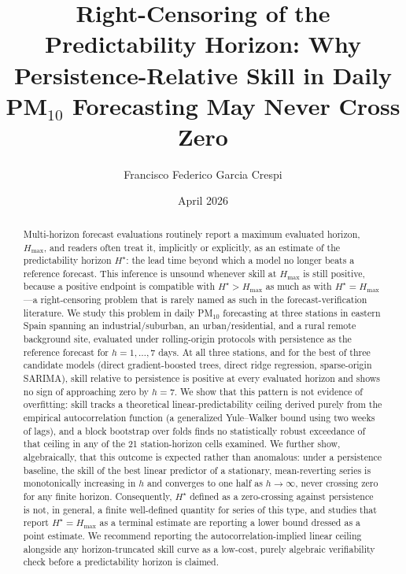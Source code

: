 \documentclass{article}
\title{Right-Censoring of the Predictability Horizon: Why
Persistence-Relative Skill in Daily PM$_{10}$ Forecasting May Never Cross Zero}
\author{Francisco Federico Garcia Crespi}
\date{April 2026}
\newcommand{\hstar}{H^{\star}}
\begin{document}
\maketitle

\begin{abstract}
Multi-horizon forecast evaluations routinely report a maximum evaluated
horizon, $H_{\max}$, and readers often treat it, implicitly or explicitly, as
an estimate of the predictability horizon $\hstar$: the lead time beyond which
a model no longer beats a reference forecast.
This inference is unsound whenever skill at $H_{\max}$ is still positive,
because a positive endpoint is compatible with $\hstar > H_{\max}$ as much as
with $\hstar = H_{\max}$---a right-censoring problem that is rarely named as
such in the forecast-verification literature.
We study this problem in daily PM$_{10}$ forecasting at three stations in
eastern Spain spanning an industrial/suburban, an urban/residential, and a
rural remote background site, evaluated under rolling-origin protocols with
persistence as the reference forecast for $h=1,\dots,7$ days.
At all three stations, and for the best of three candidate models (direct
gradient-boosted trees, direct ridge regression, sparse-origin SARIMA), skill
relative to persistence is positive at every evaluated horizon and shows no
sign of approaching zero by $h=7$.
We show that this pattern is not evidence of overfitting: skill tracks a
theoretical linear-predictability ceiling derived purely from the empirical
autocorrelation function (a generalized Yule--Walker bound using two weeks of
lags), and a block bootstrap over folds finds no statistically robust
exceedance of that ceiling in any of the 21 station-horizon cells examined.
We further show, algebraically, that this outcome is expected rather than
anomalous: under a persistence baseline, the skill of the best linear
predictor of a stationary, mean-reverting series is monotonically increasing
in $h$ and converges to one half as $h\to\infty$, never crossing zero for any
finite horizon.
Consequently, $\hstar$ defined as a zero-crossing against persistence is not,
in general, a finite well-defined quantity for series of this type, and
studies that report $\hstar = H_{\max}$ as a terminal estimate are reporting a
lower bound dressed as a point estimate.
We recommend reporting the autocorrelation-implied linear ceiling alongside
any horizon-truncated skill curve as a low-cost, purely algebraic
verifiability check before a predictability horizon is claimed.
\end{abstract}
\end{document}
